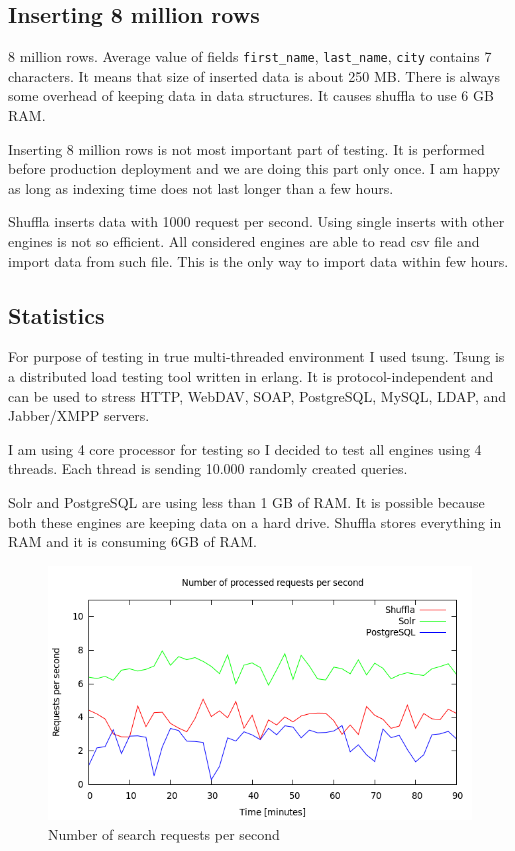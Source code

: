 \documentclass[10pt,a4paper]{article}
\begin{document}
\subsection{Inserting 8 million rows}

8 million rows. Average value of fields \verb|first_name|, \verb|last_name|, \verb|city| contains 7 characters. It means that size of inserted data is about 250 MB. There is always some overhead of keeping data in data structures. It causes shuffla to use 6 GB RAM.

Inserting 8 million rows is not most important part of testing. It is performed before production deployment and we are doing this part only once. I am happy as long as indexing time does not last longer than a few hours. 

Shuffla inserts data with 1000 request per second. Using single inserts with other engines is not so efficient. All considered engines are able to read csv file and import data from such file. This is the only way to import data within few hours.

\subsection{Statistics}

For purpose of testing in true multi-threaded environment I used tsung. Tsung is a distributed load testing tool written in erlang. It is protocol-independent and can be used to stress HTTP, WebDAV, SOAP, PostgreSQL, MySQL, LDAP, and Jabber/XMPP servers. 

I am using 4 core processor for testing so I decided to test all engines using 4 threads. Each thread is sending 10.000 randomly created queries. 

Solr and PostgreSQL are using less than 1 GB of RAM. It is possible because both these engines are keeping data on a hard drive. Shuffla stores everything in RAM and it is consuming 6GB of RAM. 

\begin{figure}
\centering
  \includegraphics[width=12cm]{request_count_tn}
  \caption{Number of search requests per second}
  \label{fig:request_count_tn}
\end{figure}
\end{document}
